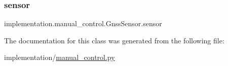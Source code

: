 \subsubsection{\texorpdfstring{sensor}{sensor}}
{\footnotesize\ttfamily implementation.\+manual\+\_\+control.\+Gnss\+Sensor.\+sensor}



The documentation for this class was generated from the following file\+:\begin{DoxyCompactItemize}
\item 
implementation/\hyperlink{manual__control_8py}{manual\+\_\+control.\+py}\end{DoxyCompactItemize}
